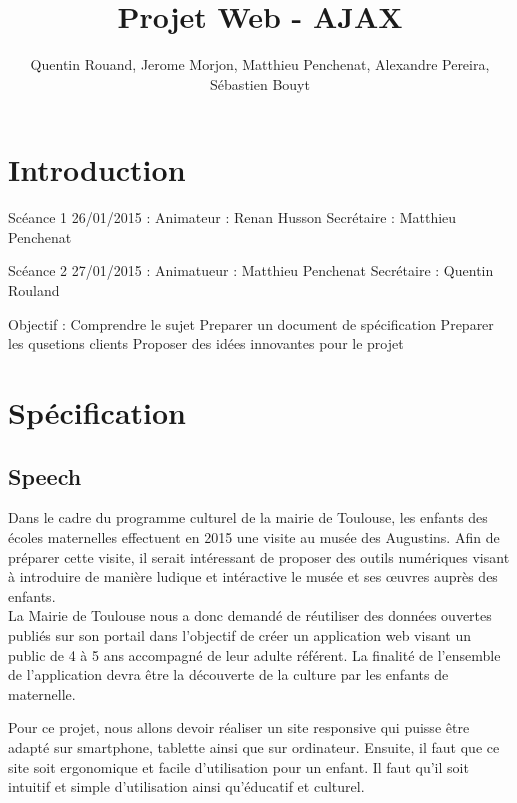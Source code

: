 \documentclass[12pt,a4paper]{report}
\author{Quentin Rouand, Jerome Morjon, Matthieu Penchenat, Alexandre Pereira, Sébastien Bouyt}
\affil{Université Toulouse, Jean Jaurès - L3 MIASHS - Document D1 : Specification Fonctionnelle}
\begin{document}
\title{Projet Web - AJAX} 
\maketitle

\renewcommand{\contentsname}{Sommaire}
\tableofcontents

\chapter*{Introduction}
Scéance 1 26/01/2015 : 
Animateur : Renan Husson
Secrétaire : Matthieu Penchenat

Scéance 2 27/01/2015 :
Animatueur : Matthieu Penchenat
Secrétaire : Quentin Rouland

Objectif : 
Comprendre le sujet
Preparer un document de spécification
Preparer les qusetions clients
Proposer des idées innovantes pour le projet



\chapter{Spécification}

\section{Speech}

Dans le cadre du programme culturel de la mairie de Toulouse, les enfants des écoles maternelles effectuent en 2015 une visite au musée des Augustins. Afin de préparer cette visite, il serait intéressant de proposer des outils numériques visant à introduire de manière ludique et intéractive le musée et ses œuvres auprès des enfants.\\

La Mairie de Toulouse nous a donc demandé de réutiliser des données ouvertes publiés sur son portail dans l'objectif de créer un application web visant un public de 4 à 5 ans accompagné de leur adulte référent. La finalité de l'ensemble de l'application devra être la découverte de la culture par les enfants de maternelle.

Pour ce projet, nous allons devoir réaliser un site responsive qui puisse être adapté sur smartphone, tablette ainsi que sur ordinateur. Ensuite, il faut que ce site soit ergonomique et facile d'utilisation pour un enfant. Il faut qu'il soit intuitif et simple d'utilisation ainsi qu'éducatif et culturel.
\end{document}
